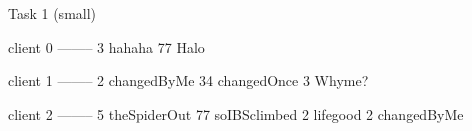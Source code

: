 Task 1 (small)

client 0
--------
3 hahaha
77 Halo

client 1
--------
2 changedByMe
34 changedOnce
3 Whyme?

client 2
--------
5 theSpiderOut
77 soIBSclimbed
2 lifegood
2 changedByMe

